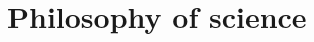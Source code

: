 \documentclass[../summary.tex]{subfiles}
\begin{document}
	
	\section{Philosophy of science}
	
\end{document}
